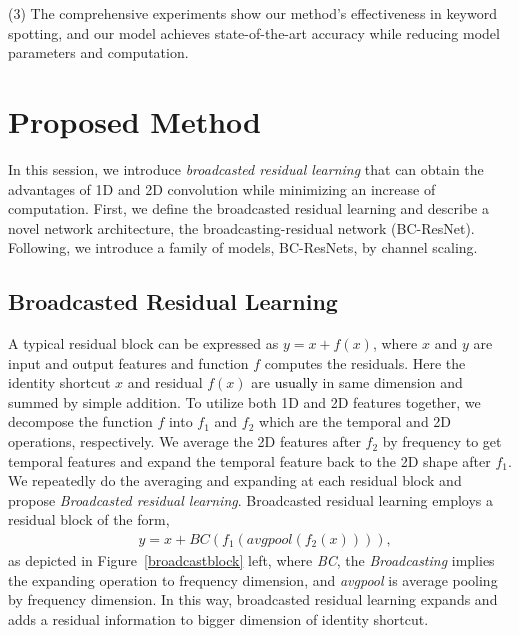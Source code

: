 \documentclass[a4paper]{article}
\newcommand\bg[1]{\textcolor{blue}{#1}}
\renewcommand\bg[1]{\textcolor{black}{#1}}
\begin{document}
(3) The comprehensive experiments show our method's effectiveness in keyword spotting, and our model achieves state-of-the-art accuracy while reducing model parameters and computation.

\section{Proposed Method}

In this session, we introduce \textit{broadcasted residual learning} that can obtain the advantages of 1D and 2D convolution while minimizing an increase of computation. First, we define the broadcasted residual learning and describe a novel network architecture, the broadcasting-residual network (BC-ResNet). 
Following, we introduce a family of models, BC-ResNets, by channel scaling.

\subsection{Broadcasted Residual Learning}

A typical residual block \cite{residual} can be expressed as $y = x + f(x)$, where $x$ and $y$ are input and output features and function $f$ computes the residuals. Here the identity shortcut $x$ and residual $f(x)$ are \bg{usually} in same dimension and summed by simple addition. 
To utilize both 1D and 2D features together, we decompose the function $f$ into $f_1$ and $f_2$ which are the temporal and 2D operations, respectively. We average the 2D features after $f_2$ by frequency to get temporal features and expand the temporal feature back to the 2D shape after $f_1$. We repeatedly do the averaging and expanding at each residual block and propose \textit{Broadcasted residual learning}. Broadcasted residual learning employs a residual block of the form, 
\begin{align}\label{eq:broadcastsum1}
    & y = x + \textit{BC}(f_1(\textit{avgpool}(f_2(x)))),
\end{align}
as depicted in Figure~\ref{broadcastblock} left, where \textit{BC}, the \textit{Broadcasting} implies the expanding operation to frequency dimension, and \textit{avgpool} is average pooling by frequency dimension. In this way, broadcasted residual learning expands and adds a residual information to bigger dimension of identity shortcut.
\end{document}
